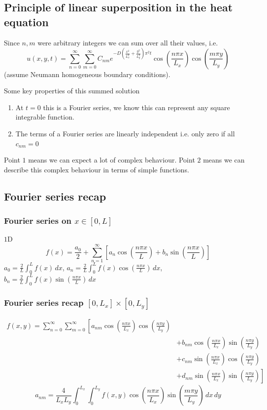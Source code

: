 \documentclass[10pt, a4paper]{article}
\begin{document}
\subsection{Principle of linear superposition in the heat equation}
Since $n, m$ were arbitrary integers we can sum over all their values,
i.e.
\[
u(x, y, t) = \sum_{n = 0}^{\infty}\sum_{m = 0}^{\infty}C_{nm}e ^ {-D\left(\frac{x ^ 2}{L_x ^ 2} + \frac{y ^ 2}{L_y ^ 2}\right)\pi ^ 2t}\cos\left(\frac{n\pi x}{L_x}\right)\cos\left(\frac{m\pi y}{L_y}\right)
\]
(assume Neumann homogeneous boundary conditions).

Some key properties of this summed solution
\begin{enumerate}[label = (\arabic*)]
    \item At $t = 0$ this is a Fourier series,
    we know this can represent any square integrable function.

    \item The terms of a Fourier series are linearly independent i.e. only zero if all $c_{nm} = 0$
\end{enumerate}
Point $1$ means we can expect a lot of complex behaviour.
Point $2$ means we can describe this complex behaviour in terms of simple functions.

\subsection{Fourier series recap}

\subsubsection{Fourier series on \texorpdfstring{$x \in [0, L]$}{}}

$1$D
\[
f(x) = \frac{a_0}{2} + \sum_{n = 1}^{\infty}\left[a_n\cos\left(\frac{n\pi x}{L}\right) + b_n\sin\left(\frac{n\pi x}{L}\right)\right]
\]
$a_0 = \frac{2}{L}\int_{0}^{L}f(x)\,dx$,
$a_n = \frac{2}{L}\int_{0}^{L}f(x)\cos\left(\frac{n\pi x}{L}\right)\,dx$,
$b_n = \frac{2}{L}\int_{0}^{L}f(x)\sin\left(\frac{n\pi x}{L}\right)\,dx$

\subsubsection{Fourier series recap \texorpdfstring{$[0, L_x] \times [0, L_y]$}{}}

\begin{align*}
    f(x, y) = \sum_{n = 0}^{\infty}\sum_{m = 0}^{\infty}\left[a_{nm}\cos\left(\frac{n\pi x}{L_x}\right)\cos\left(\frac{n\pi y}{L_y}\right)\right.& \\
    &+ b_{nm}\cos\left(\frac{n\pi x}{L_x}\right)\sin\left(\frac{n\pi y}{L_y}\right) \\
    &+ c_{nm}\sin\left(\frac{n\pi x}{L_x}\right)\cos\left(\frac{n\pi y}{L_y}\right) \\
    &\left.+ d_{nm}\sin\left(\frac{n\pi x}{L_x}\right)\sin\left(\frac{n\pi y}{L_y}\right)\right]
\end{align*}
\[
a_{nm} = \frac{4}{L_xL_y}\int_{0}^{L_x}\int_{0}^{L_y}f(x, y)\cos\left(\frac{n\pi x}{L_x}\right)\sin\left(\frac{m\pi y}{L_y}\right)\,dx\,dy
\]
\end{document}

